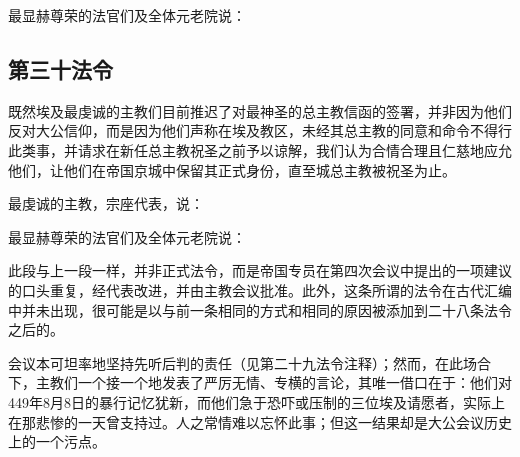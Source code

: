 \par

最显赫尊荣的法官们及全体元老院说：\par


\subsection{第三十法令}

既然埃及最虔诚的主教们目前推迟了对最神圣的总主教信函的签署，并非因为他们反对大公信仰，而是因为他们声称在埃及教区，未经其总主教的同意和命令不得行此类事，并请求在新任总主教祝圣之前予以谅解，我们认为合情合理且仁慈地应允他们，让他们在帝国京城中保留其正式身份，直至城总主教被祝圣为止。\par

最虔诚的主教，宗座代表，说：\par

\par

最显赫尊荣的法官们及全体元老院说：\par

\par

\par

\par

此段与上一段一样，并非正式法令，而是帝国专员在第四次会议中提出的一项建议的口头重复，经代表改进，并由主教会议批准。此外，这条所谓的法令在古代汇编中并未出现，很可能是以与前一条相同的方式和相同的原因被添加到二十八条法令之后的。\par

\par

会议本可坦率地坚持先听后判的责任（见第二十九法令注释）；然而，在此场合下，主教们一个接一个地发表了严厉无情、专横的言论，其唯一借口在于：他们对449年8月8日的暴行记忆犹新，而他们急于恐吓或压制的三位埃及请愿者，实际上在那悲惨的一天曾支持过。人之常情难以忘怀此事；但这一结果却是大公会议历史上的一个污点。\par

